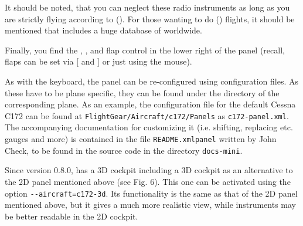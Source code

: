 It should be noted, that you can neglect these radio instruments as long as you are strictly flying according to  (). For those wanting to do  () flights, it should be mentioned that \FlightGear{} includes a huge database of  worldwide.

Finally, you find the , , and flap control in
the lower right of the panel (recall, flaps can be set via $[$ and $]$ or just using the mouse).

As with the keyboard, the panel can be re-configured using
configuration files. As these have to be plane specific, they can be found under the
directory of the corresponding plane. As an example, the configuration file for the
default Cessna C172 can be found at \texttt{FlightGear/Aircraft/c172/Panels} as
\texttt{c172-panel.xml}. The accompanying documentation for customizing it (i.e. shifting,
replacing etc. gauges and more) is contained in the file \texttt{README.xmlpanel} written by John Check,
to be found in the source code in the directory \texttt{docs-mini}.

Since version 0.8.0, \FlightGear{} has a 3D cockpit including a 3D cockpit as an alternative to the 2D panel mentioned above (see Fig. 6). This one can be activated using the option \texttt{-$ $-aircraft=c172-3d}. Its functionality is the same as that of the 2D panel mentioned above, but it gives a much more realistic view, while instruments may be better readable in the 2D cockpit.
\medskip

 \centerline{}

